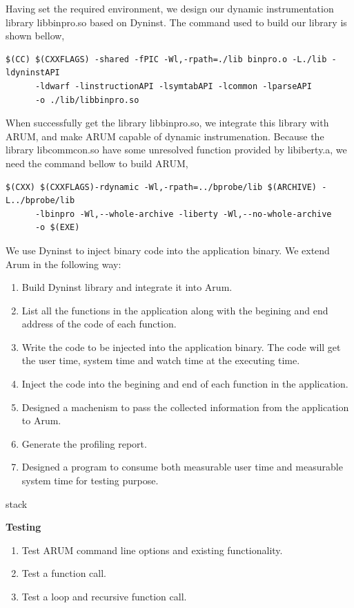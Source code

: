 \documentclass[11pt,letterpaper,oneside]{article}
\begin{document}
Having set the required environment, we design our dynamic instrumentation library libbinpro.so based on Dyninst. The command used to build our library is shown bellow,

\begin{Verbatim}[frame=single]
$(CC) $(CXXFLAGS) -shared -fPIC -Wl,-rpath=./lib binpro.o -L./lib -ldyninstAPI
      -ldwarf -linstructionAPI -lsymtabAPI -lcommon -lparseAPI
      -o ./lib/libbinpro.so
\end{Verbatim}

When successfully get the library libbinpro.so, we integrate this library with ARUM, and make ARUM capable of dynamic instrumenation. Because the library libcommcon.so have some unresolved function provided by libiberty.a, we need the command bellow to build ARUM,

\begin{Verbatim}[frame=single]
$(CXX) $(CXXFLAGS)-rdynamic -Wl,-rpath=../bprobe/lib $(ARCHIVE) -L../bprobe/lib
      -lbinpro -Wl,--whole-archive -liberty -Wl,--no-whole-archive
      -o $(EXE)
\end{Verbatim}


We use Dyninst to inject binary code into the application binary. We extend Arum in the following way:
\begin{enumerate}
\item Build Dyninst library and integrate it into Arum.
\item List all the functions in the application along with the begining and end address of the code of each function.
\item Write the code to be injected into the application binary. The code will get the user time, system time and watch time at the executing time.
\item Inject the code into the begining and end of each function in the application.
\item Designed a machenism to pass the collected information from the application to Arum.
\item Generate the profiling report.
\item Designed a program to consume both measurable user time and measurable system time for testing purpose.
\end{enumerate}

stack

\textbf{Testing}
\begin{enumerate}
\item Test ARUM command line options and existing functionality.
\item Test a function call.
\item Test a loop and recursive function call.
\end{enumerate}
\end{document}
